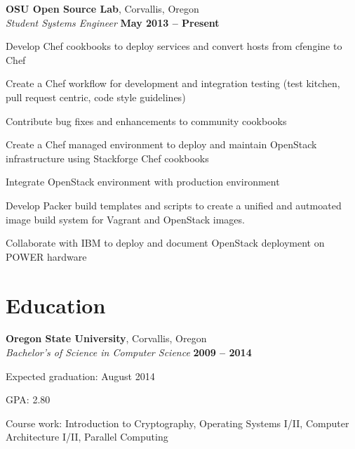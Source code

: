\documentclass[margin,line]{resume}
\begin{document}
\begin{resume}
    \textbf{OSU Open Source Lab}, Corvallis, Oregon \vspace{2mm}\\\vspace{1mm}%
    \textsl{Student Systems Engineer} \hfill \textbf{May 2013 -- Present}\\
    \begin{list2}
        \item Develop Chef cookbooks to deploy services and convert hosts from cfengine to Chef
        \item Create a Chef workflow for development and integration testing (test kitchen, pull request centric, code style guidelines)
        \item Contribute bug fixes and enhancements to community cookbooks
        \item Create a Chef managed environment to deploy and maintain OpenStack infrastructure using Stackforge Chef cookbooks
        \item Integrate OpenStack environment with production environment
        \item Develop Packer build templates and scripts to create a unified and autmoated image build system for Vagrant and OpenStack images.
        \item Collaborate with IBM to deploy and document OpenStack deployment on POWER hardware\\
    \end{list2}\vspace{-1.5mm}


    \section{\mysidestyle Education}

    \textbf{Oregon State University}, Corvallis, Oregon \vspace{2mm}\\\vspace{1mm}%
    \textsl{Bachelor's of Science in Computer Science} \hfill \textbf{ 2009 -- 2014}\vspace{-3mm}\\\vspace{-1mm}%
    \begin{list2}
        \item Expected graduation: August 2014
        \item GPA:  2.80
        \item Course work: Introduction to Cryptography, Operating Systems I/II,
              Computer Architecture I/II, Parallel Computing\\
    \end{list2}\vspace{-1.5mm}



\end{resume}
\end{document}

